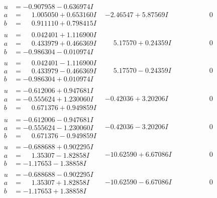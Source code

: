 \documentclass[1p]{elsarticle_modified}
\theoremstyle{definition}
\begin{document}
$$\begin{array}{c|c|c}
\begin{aligned}
u &= -0.907958 - 0.636974 I \\
a &= \phantom{-}1.005050 + 0.653160 I \\
b &= \phantom{-}0.911110 + 0.798415 I\end{aligned}
 & -2.46547 + 5.87569 I & \phantom{-0.000000 } 0 \\ \hline\begin{aligned}
u &= \phantom{-}0.042401 + 1.116900 I \\
a &= \phantom{-}0.433979 + 0.466369 I \\
b &= -0.986304 - 0.010974 I\end{aligned}
 & \phantom{-}5.17570 + 0.24359 I & \phantom{-0.000000 } 0 \\ \hline\begin{aligned}
u &= \phantom{-}0.042401 - 1.116900 I \\
a &= \phantom{-}0.433979 - 0.466369 I \\
b &= -0.986304 + 0.010974 I\end{aligned}
 & \phantom{-}5.17570 - 0.24359 I & \phantom{-0.000000 } 0 \\ \hline\begin{aligned}
u &= -0.612006 + 0.947681 I \\
a &= -0.555624 + 1.230060 I \\
b &= \phantom{-}0.671376 + 0.949859 I\end{aligned}
 & -0.42036 + 3.20206 I & \phantom{-0.000000 } 0 \\ \hline\begin{aligned}
u &= -0.612006 - 0.947681 I \\
a &= -0.555624 - 1.230060 I \\
b &= \phantom{-}0.671376 - 0.949859 I\end{aligned}
 & -0.42036 - 3.20206 I & \phantom{-0.000000 } 0 \\ \hline\begin{aligned}
u &= -0.688688 + 0.902295 I \\
a &= \phantom{-}1.35307 - 1.82858 I \\
b &= -1.17653 - 1.38858 I\end{aligned}
 & -10.62590 + 6.67086 I & \phantom{-0.000000 } 0 \\ \hline\begin{aligned}
u &= -0.688688 - 0.902295 I \\
a &= \phantom{-}1.35307 + 1.82858 I \\
b &= -1.17653 + 1.38858 I\end{aligned}
 & -10.62590 - 6.67086 I & \phantom{-0.000000 } 0 \\ \hline\begin{aligned}

\end{aligned}
\end{array}$$
\end{document}

